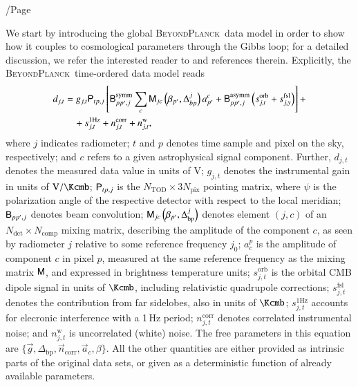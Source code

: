 /Page\documentclass[twocolumn]{aa}
\newcommand{\n}[0]{\vec{n}}
\renewcommand{\a}[0]{\vec{a}}
\newcommand{\B}[0]{\tens{B}}
\newcommand{\g}[0]{\vec{g}}
\newcommand{\M}[0]{\tens{M}}
\renewcommand{\P}[0]{\tens{P}}
\newcommand{\BP}{\textsc{BeyondPlanck}}
\begin{document}
We start by introducing the global \BP\ data model in order to
show how it couples to cosmological parameters through the Gibbs loop;
for a detailed discussion, we refer the interested reader to
\citet{bp01} and references therein. Explicitly, the \BP\ time-ordered
data model reads
\begin{equation}
  \label{eq:data_model}
  \begin{split}
  d_{j,t} &= g_{j,t}{\P}_{tp,j}\left[ {\B}_{pp',j}^{\mathrm{symm}} \sum_c 
  {\M}_{jc}\left(\beta_{p'},\Delta_{bp}^j\right) a_{p'}^c +{\B}_{pp',j}^{\mathrm{asymm}}
  \left(s_{j,t}^{\mathrm{orb}}+s_{j,y}^{\mathrm{fsl}}\right)\right] + \\
  & \quad + s_{j,t}^{\mathrm{1Hz}} + n_{j,t}^{\mathrm{corr}}+n_{j,t}^{\mathrm{w}},
  \end{split}
\end{equation}
where $j$ indicates radiometer; $t$ and $p$ denotes time sample and
pixel on the sky, respectively; and $c$ refers to a given
astrophysical signal component. Further, $d_{j,t}$ denotes the
measured data value in units of $\si{\volt}$; $g_{j,t}$ denotes the
instrumental gain in units of $\si{\volt\per\Kcmb}$; $\P_{tp,j}$ is
the $N_{\mathrm{TOD}}\times 3N_{\mathrm{pix}}$ pointing matrix, where
$\psi$ is the polarization angle of the respective detector with
respect to the local meridian; $\B_{pp',j}$ denotes beam convolution;
$\M_{jc}\left(\beta_{p'},\Delta_{\mathrm{bp}}^j\right)$ denotes
element $(j,c)$ of an $N_{\mathrm{det}}\times N_{\mathrm{comp}}$
mixing matrix, describing the amplitude of the component $c$, as seen
by radiometer $j$ relative to some reference frequency $j_0$; $a_c^p$
is the amplitude of component $c$ in pixel $p$, measured at the same
reference frequency as the mixing matrix $\M$, and expressed in
brightness temperature units; $s_{j,t}^{\mathrm{orb}}$ is the orbital
CMB dipole signal in units of $\si{\Kcmb}$, including relativistic
quadrupole corrections; $s_{j,t}^{\mathrm{fsl}}$ denotes the
contribution from far sidelobes, also in units of $\si{\Kcmb}$;
$s_{j,t}^{\mathrm{1Hz}}$ accounts for elecronic interference with a
1\,Hz period; $n_{j,t}^{\mathrm{corr}}$ denotes correlated
instrumental noise; and $n_{j,t}^{\mathrm{w}}$ is uncorrelated (white)
noise. The free parameters in this equation are
$\lbrace\g,\Delta_{\mathrm{bp}},\n_{\mathrm{corr}},\a_c,\beta\rbrace$. All
the other quantities are either provided as intrinsic parts of the
original data sets, or given as a deterministic function of already
available parameters.
\end{document}
